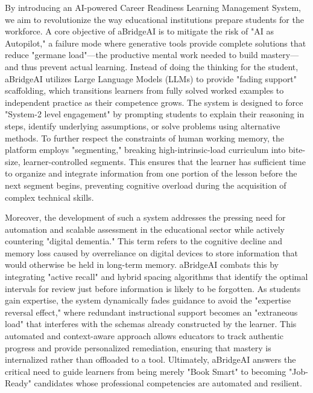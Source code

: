 By introducing an AI-powered Career Readiness Learning Management System, we aim to revolutionize the way educational institutions prepare students for the workforce. A core objective of aBridgeAI is to mitigate the risk of "AI as Autopilot," a failure mode where generative tools provide complete solutions that reduce "germane load"—the productive mental work needed to build mastery—and thus prevent actual learning. Instead of doing the thinking for the student, aBridgeAI utilizes Large Language Models (LLMs) to provide "fading support" scaffolding, which transitions learners from fully solved worked examples to independent practice as their competence grows. The system is designed to force "System-2 level engagement" by prompting students to explain their reasoning in steps, identify underlying assumptions, or solve problems using alternative methods. To further respect the constraints of human working memory, the platform employs "segmenting," breaking high-intrinsic-load curriculum into bite-size, learner-controlled segments. This ensures that the learner has sufficient time to organize and integrate information from one portion of the lesson before the next segment begins, preventing cognitive overload during the acquisition of complex technical skills\cite{studiomg_cognitive_ai, mayer2003}.

Moreover, the development of such a system addresses the pressing need for automation and scalable assessment in the educational sector while actively countering "digital dementia." This term refers to the cognitive decline and memory loss caused by overreliance on digital devices to store information that would otherwise be held in long-term memory. aBridgeAI combats this by integrating "active recall" and hybrid spacing algorithms that identify the optimal intervals for review just before information is likely to be forgotten. As students gain expertise, the system dynamically fades guidance to avoid the "expertise reversal effect," where redundant instructional support becomes an "extraneous load" that interferes with the schemas already constructed by the learner. This automated and context-aware approach allows educators to track authentic progress and provide personalized remediation, ensuring that mastery is internalized rather than offloaded to a tool. Ultimately, aBridgeAI answers the critical need to guide learners from being merely "Book Smart" to becoming "Job-Ready" candidates whose professional competencies are automated and resilient\cite{Renkl2003, wozniak1998sm2}.